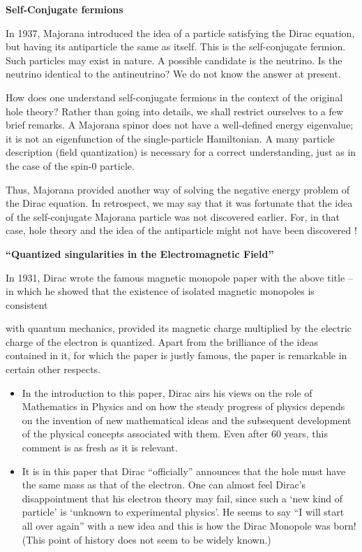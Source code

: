 \textbf{Self-Conjugate fermions}

In 1937, Majorana introduced the idea of a particle satisfying the Dirac equation, but having its antiparticle the same as itself. This is the self-conjugate fermion. Such particles may exist in nature. A possible candidate is the neutrino. Is the neutrino identical to the antineutrino? We do not know the answer at present.

How does one understand self-conjugate fermions in the context of the original hole theory? Rather than going into details, we shall restrict ourselves to a few brief remarks. A Majorana spinor does not have a well-defined energy eigenvalue; it is not an eigenfunction of the single-particle Hamiltonian. A many particle description (field quantization) is necessary for a correct understanding, just as in the case of the spin-0 particle.

Thus, Majorana provided another way of solving the negative energy problem of the Dirac equation. In retrospect, we may say that it was fortunate that the idea of the self-conjugate Majorana particle was not discovered earlier. For, in that case, hole theory and the idea of the antiparticle might not have been discovered !

\textbf{“Quantized singularities in the Electromagnetic Field”}

In 1931, Dirac wrote the famous magnetic monopole paper with the above title – in which he showed that the existence of isolated magnetic monopoles is consistent

with quantum mechanics, provided its magnetic charge multiplied by the electric charge of the electron is quantized. Apart from the brilliance of the ideas contained in it, for which the paper is justly famous, the paper is remarkable in certain other respects.
\begin{itemize}
   \item In the introduction to this paper, Dirac airs his views on the role of Mathematics in Physics and on how the steady progress of physics depends on the invention of new mathematical ideas and the subsequent development of the physical concepts associated with them. Even after 60 years, this comment is as fresh as it is relevant.
    
    \item It is in this paper that Dirac “officially” announces that the hole must have the same mass as that of the electron. One can almost feel Dirac’s disappointment that his electron theory may fail, since such a ‘new kind of particle’ is ‘unknown to experimental physics’. He seems to say “I will start all over again” with a new idea and this is how the Dirac Monopole was born! (This point of history does not seem to be widely known.)
\end{itemize}

